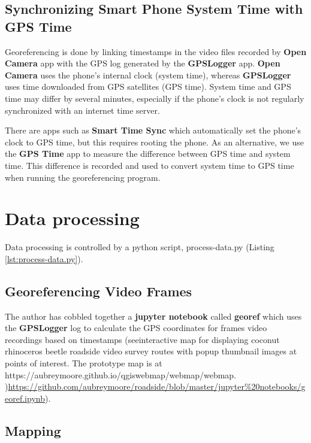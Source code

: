 \documentclass[12pt,letterpaper,english,bibliography=totocnumbered, abstract=on]{scrartcl}
\begin{document}
\subsection{Synchronizing Smart Phone System Time with GPS Time}

Georeferencing is done by linking timestamps in the video files recorded by \textbf{Open Camera} app with the GPS log generated by the \textbf{GPSLogger} app. \textbf{Open Camera} uses the phone's internal clock (system time), whereas \textbf{GPSLogger} uses time downloaded from GPS satellites (GPS time). System time and GPS time may differ by several minutes, especially if the phone's clock is not regularly synchronized with an internet time server.

There are apps such as \textbf{Smart Time Sync} which automatically set the phone's clock to GPS time, but this requires rooting the phone. As an alternative, we use the \textbf{GPS Time} app to measure the difference between GPS time and system time. This difference is recorded and used to convert system time to GPS time when running the georeferencing program.


\section{Data processing}

Data processing is controlled by a python script, process-data.py (Listing \ref{lst:process-data.py}).




\subsection{Georeferencing Video Frames}

The author has cobbled together a \textbf{jupyter notebook} called \textbf{georef} which uses the \textbf{GPSLogger} log to calculate the GPS coordinates for frames video recordings based on timestamps (seeinteractive map for displaying coconut rhinoceros beetle roadside video survey routes with popup thumbnail images at points of interest. The prototype map is at https://aubreymoore.github.io/qgiswebmap/webmap/webmap. )\url{https://github.com/aubreymoore/roadside/blob/master/jupyter%20notebooks/georef.ipynb}). 
	
\subsection{Mapping}
\end{document}
